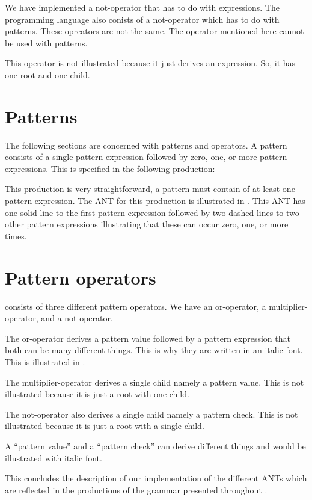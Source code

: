We have implemented a not-operator that has to do with expressions. The programming
language also conists of a not-operator which has to do with patterns. These
opreators are not the same. The operator mentioned here cannot be used with
patterns. 

This operator is not illustrated because it just derives an expression. So, it 
has one root and one child.

\section{Patterns}

The following sections are concerned with patterns and operators. A pattern
consists of a single pattern expression followed by zero, one, or more pattern
expressions.  This is specified in the following production:

\begin{ebnf}
\end{ebnf}

This production is very straightforward, a pattern must contain of at least one
pattern expression. The ANT for this production is illustrated in
. This ANT has one solid line to the first pattern
expression followed by two dashed lines to two other pattern expressions
illustrating that these can occur zero, one, or more times.



\section{Pattern operators}

\productname{} consists of three different pattern operators. We have an
or-operator, a multiplier-operator, and a not-operator.

The or-operator derives a pattern value followed by a pattern expression that
both can be many different things. This is why they are written in an italic
font. This is illustrated in .



The multiplier-operator derives a single child namely a pattern value. This is
not illustrated because it is just a root with one child.

The not-operator also derives a single child namely a pattern check. This is not
illustrated because it is just a root with a single child.

A ``pattern value'' and a ``pattern check'' can derive different things and
would be illustrated with italic font.

This concludes the description of our implementation of the different ANTs which 
are reflected in the productions of the grammar presented throughout
.

